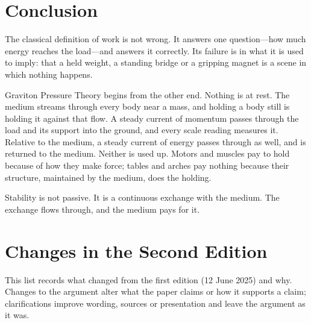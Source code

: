 \documentclass[11pt,a4paper]{article}
\begin{document}
\section{Conclusion}

The classical definition of work is not wrong. It answers one question---how much energy reaches the load---and answers it correctly. Its failure is in what it is used to imply: that a held weight, a standing bridge or a gripping magnet is a scene in which nothing happens.

Graviton Pressure Theory begins from the other end. Nothing is at rest. The medium streams through every body near a mass, and holding a body still is holding it against that flow. A steady current of momentum passes through the load and its support into the ground, and every scale reading measures it. Relative to the medium, a steady current of energy passes through as well, and is returned to the medium. Neither is used up. Motors and muscles pay to hold because of how they make force; tables and arches pay nothing because their structure, maintained by the medium, does the holding.

Stability is not passive. It is a continuous exchange with the medium. The exchange flows through, and the medium pays for it.


\clearpage
\section*{Changes in the Second Edition}

This list records what changed from the first edition (12 June 2025) and why. Changes to the argument alter what the paper claims or how it supports a claim; clarifications improve wording, sources or presentation and leave the argument as it was.
\end{document}
